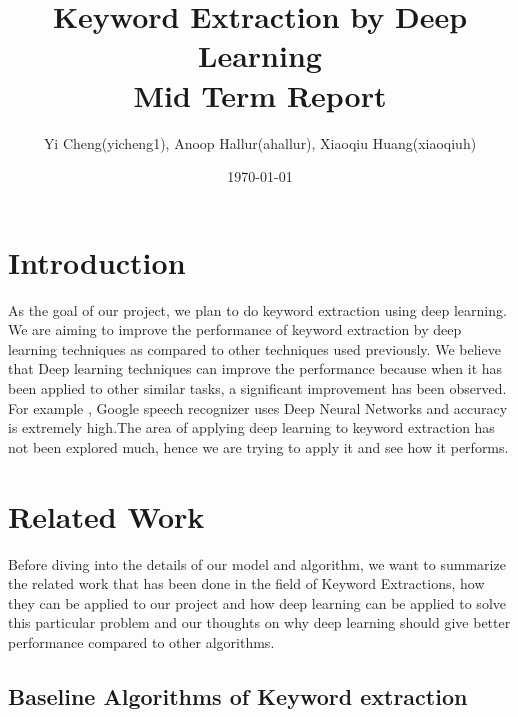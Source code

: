 \documentclass[dvips,9pt]{article}
\begin{document}
	
	
	\title{Keyword Extraction by Deep Learning \\Mid Term Report}
	\author{Yi Cheng(yicheng1), Anoop Hallur(ahallur), Xiaoqiu Huang(xiaoqiuh)}
	\date{\today}
	
	
	\maketitle
	
	
	\section{Introduction}
	
		As the goal of our project, we plan to do keyword extraction using deep learning. We are aiming to improve the performance of keyword extraction by deep learning techniques as compared to other techniques used previously.
		We believe that Deep learning techniques can improve the performance because when it has been applied to other similar tasks, a significant improvement has been observed.
		For example , Google speech recognizer uses Deep Neural Networks and accuracy is extremely high\cite{hinton2012deep}.The area of applying deep learning to keyword extraction has not been explored much, hence we are trying to apply it and see how it performs.
	\section{Related Work}
	
		Before diving into the details of our model and algorithm, we want to summarize the related work that has been done in the field of Keyword Extractions, how they can be applied to our project and how deep learning can be applied to solve this particular problem and our thoughts on why deep learning should give better performance compared to other algorithms.
		
		\subsection{Baseline Algorithms of Keyword extraction}
		
\end{document}
